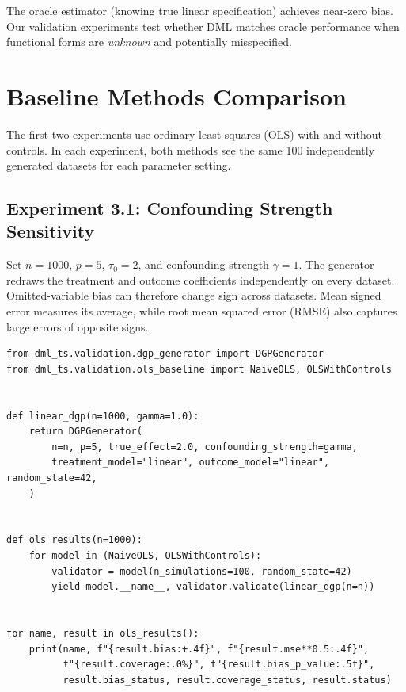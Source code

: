 The oracle estimator (knowing true linear specification) achieves near-zero bias. Our validation experiments test whether DML matches oracle performance when functional forms are \textit{unknown} and potentially misspecified.


\section{Baseline Methods Comparison}

The first two experiments use ordinary least squares (OLS) with and without controls. In each experiment, both methods see the same 100 independently generated datasets for each parameter setting.

\subsection{Experiment 3.1: Confounding Strength Sensitivity}

Set $n=1000$, $p=5$, $\tau_0=2$, and confounding strength $\gamma=1$. The generator redraws the treatment and outcome coefficients independently on every dataset. Omitted-variable bias can therefore change sign across datasets. Mean signed error measures its average, while root mean squared error (RMSE) also captures large errors of opposite signs.

\begin{verbatim}
from dml_ts.validation.dgp_generator import DGPGenerator
from dml_ts.validation.ols_baseline import NaiveOLS, OLSWithControls


def linear_dgp(n=1000, gamma=1.0):
    return DGPGenerator(
        n=n, p=5, true_effect=2.0, confounding_strength=gamma,
        treatment_model="linear", outcome_model="linear", random_state=42,
    )


def ols_results(n=1000):
    for model in (NaiveOLS, OLSWithControls):
        validator = model(n_simulations=100, random_state=42)
        yield model.__name__, validator.validate(linear_dgp(n=n))


for name, result in ols_results():
    print(name, f"{result.bias:+.4f}", f"{result.mse**0.5:.4f}",
          f"{result.coverage:.0%}", f"{result.bias_p_value:.5f}",
          result.bias_status, result.coverage_status, result.status)
\end{verbatim}

